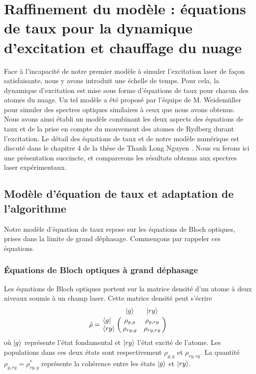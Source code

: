 \section{Raffinement du modèle : équations de taux pour la dynamique d'excitation et chauffage du nuage}
\noindent Face à l'incapacité de notre premier modèle à simuler l'excitation laser de façon satisfaisante, nous y avons introduit une échelle de temps.
Pour cela, la dynamique d'excitation est mise sous forme d'équations de taux pour chacun des atomes du nuage.
Un tel modèle a été proposé par l'équipe de M. Weidemüller \cite{MX_WEIDEMULLERRYDAGREGATES14} pour simuler des spectres optiques similaires à ceux que nous avons obtenus.
Nous avons ainsi établi un modèle combinant les deux aspects des équations de taux et de la prise en compte du mouvement des atomes de Rydberg durant l'excitation.
Le détail des équations de taux et de notre modèle numérique est discuté dans le chapitre 4 de la thèse de Thanh Long Nguyen \cite{PHD_NGUYEN}.
Nous en ferons ici une présentation succincte, et comparerons les résultats obtenus aux spectres laser expérimentaux.
	
	\subsection{Modèle d'équation de taux et adaptation de l'algorithme}\label{subsec:rate_equation}
\noindent Notre modèle d'équation de taux repose sur les équations de Bloch optiques, prises dans la limite de grand déphasage.
Commençons par rappeler ces équations.

\subsubsection*{Équations de Bloch optiques à grand déphasage}
\noindent Les équations de Bloch optiques portent sur la matrice densité d'un atome à deux niveaux soumis à un champ laser.
Cette matrice densité peut s'écrire
\begin{equation}
\label{eq:density_matrix_Bloch}
\hat{\rho} = \bordermatrix{~ 	&\ket{g} 	& \ket{ry} \cr
	\bra{g}		&\rho_{g,g}		&\rho_{g,ry}	\cr 
	\bra{ry} 		&\rho_{ry,g}		&\rho_{ry,ry} \cr}
\end{equation}
où $\ket{g}$ représente l'état fondamental et $\ket{ry}$ l'état excité de l'atome.
Les populations dans ces deux états sont respectivement $\rho_{g,g}$ et $\rho_{ry,ry}$.
La quantité $\rho_{g,ry} = \rho_{ry,g}^*$ représente la cohérence entre les états $\ket{g}$ et $\ket{ry}$.

